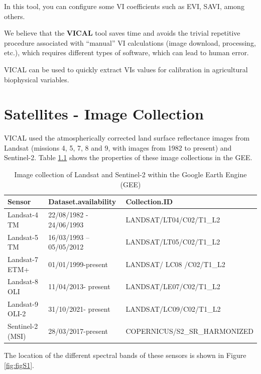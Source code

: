 \documentclass[
]{book}
\begin{document}
In this tool, you can configure some VI coefficients such as EVI, SAVI, among others.

We believe that the \textbf{VICAL} tool saves time and avoids the trivial repetitive procedure associated with ``manual'' VI calculations (image download, processing, etc.), which requires different types of software, which can lead to human error.

VICAL can be used to quickly extract VIs values for calibration in agricultural biophysical variables.

\hypertarget{Sat}{%
\chapter{Satellites - Image Collection}\label{Sat}}

VICAL used the atmospherically corrected land surface reflectance images from Landsat (missions 4, 5, 7, 8 and 9, with images from 1982 to present) and Sentinel-2. Table \ref{tab:Sat} shows the properties of these image collections in the GEE.

\begin{table}

\caption{\label{tab:Sat}Image collection of Landsat and Sentinel-2 within the Google Earth Engine (GEE)}
\centering
\begin{tabular}[t]{lll}
\toprule
Sensor & Dataset.availability & Collection.ID\\
\midrule
Landsat-4 TM & 22/08/1982 - 24/06/1993 & LANDSAT/LT04/C02/T1\_L2\\
Landsat-5 TM & 16/03/1993 – 05/05/2012 & LANDSAT/LT05/C02/T1\_L2\\
Landsat-7 ETM+ & 01/01/1999-present & LANDSAT/ LC08 /C02/T1\_L2\\
Landsat-8 OLI & 11/04/2013- present & LANDSAT/LE07/C02/T1\_L2\\
Landsat-9 OLI-2 & 31/10/2021- present & LANDSAT/LC09/C02/T1\_L2\\
\addlinespace
Sentinel-2 (MSI) & 28/03/2017-present & COPERNICUS/S2\_SR\_HARMONIZED\\
\bottomrule
\end{tabular}
\end{table}

The location of the different spectral bands of these sensors is shown in Figure \ref{fig:figS1}.
\end{document}
